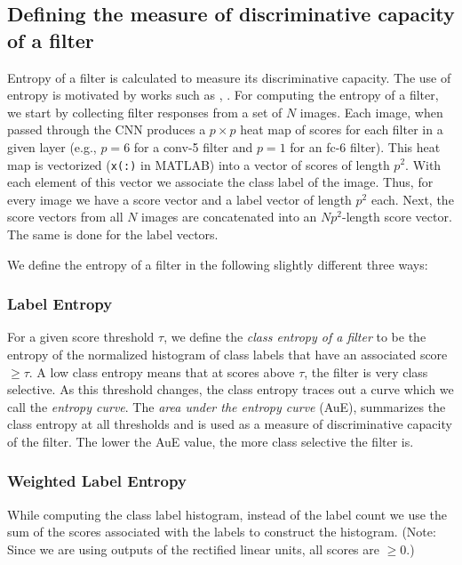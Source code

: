 \subsection{Defining the measure of discriminative capacity of a filter}
\label{sub:fine-entropy}
Entropy of a filter is calculated to measure its discriminative capacity. The use of entropy is motivated by works such as \cite{Breiman}, \cite{AmitGeman}.
For computing the entropy of a filter, we start by collecting filter responses from a set of $N$ images.
Each image, when passed through the CNN produces a $p \times p$ heat map of scores for each filter in a given layer (e.g., $p = 6$ for a conv-5 filter and $p = 1$ for an fc-6 filter).
This heat map is vectorized (\texttt{x(:)} in MATLAB) into a vector of scores of length $p^2$. With each element of this vector we associate the class label of the image. 
Thus, for every image we have a score vector and a label vector of length $p^2$ each.
Next, the score vectors from all $N$ images are concatenated into an $Np^2$-length score vector.
The same is done for the label vectors.

We define the entropy of a filter in the following slightly different three ways:
\subsubsection{Label Entropy}
\label{sub:def-label-ent}
For a given score threshold $\tau$, we define the \emph{class entropy of a filter} to be the entropy of the normalized histogram of class labels that have an associated score $\geq \tau$.
A low class entropy means that at scores above $\tau$, the filter is very class selective.
As this threshold changes, the class entropy traces out a curve which we call the \emph{entropy curve}.
The \emph{area under the entropy curve} (AuE), summarizes the class entropy at all thresholds and is used as a measure of discriminative capacity of the filter. 
The lower the AuE value, the more class selective the filter is.

\subsubsection{Weighted Label Entropy}
\label{sub:def-weighted-label-ent}
While computing the class label histogram, instead of the label count we use the sum of the scores associated with the labels to construct the histogram. (Note: Since we are using outputs of the rectified linear units, all scores are $\geq 0$.)

